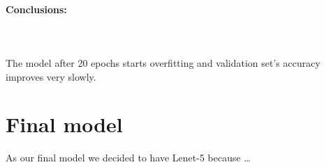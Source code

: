 \documentclass[12pt]{article}
\begin{document}
        \paragraph{Conclusions:} \mbox{} \\\\
        The model after 20 epochs starts overfitting and validation set's accuracy improves very slowly.
    \section{Final model}
      As our final model we decided to have Lenet-5 because \dots
      \inputminted[linenos]{python}{code/final_model.py}
\end{document}
